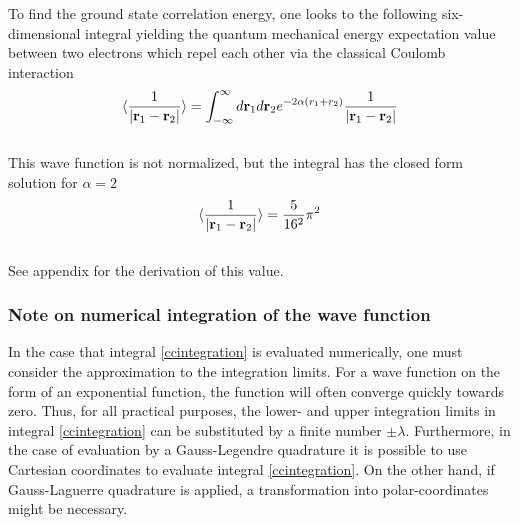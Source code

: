 \documentclass[%
reprint,nofootinbib,
amsmath,amssymb,
aps,
]{revtex4-1}
\begin{document}
To find the ground state correlation energy, one looks to the following six-dimensional integral yielding the quantum mechanical energy expectation value between two electrons which repel each other via the classical Coulomb interaction\vspace{2mm} \\
\begin{equation}\label{ccintegration}
	   \langle \frac{1}{|{\bf r}_1-{\bf r}_2|} \rangle =
	\int_{-\infty}^{\infty} d{\bf r}_1d{\bf r}_2  e^{-2\alpha (r_1+r_2)}\frac{1}{|{\bf r}_1-{\bf r}_2|}
\end{equation}\vspace{2mm} \\
This wave function is not normalized, but the integral has the closed form solution for $\alpha = 2$\vspace{2mm} \\
\begin{equation*}
\langle \frac{1}{|{\bf r}_1-{\bf r}_2|} \rangle = \dfrac{5}{16^2}\pi^2
\end{equation*}\vspace{2mm} \\
See appendix for the derivation of this value. 
\subsubsection{Note on numerical integration of the wave function} \noindent 
In the case that integral \ref{ccintegration} is evaluated numerically, one must consider the approximation to the integration limits. For a wave function on the form of an exponential function, the function will often converge quickly towards zero. Thus, for all practical purposes, the lower- and upper integration limits in integral \ref{ccintegration} can be substituted by a finite number $\pm \lambda$. Furthermore, in the case of evaluation by a Gauss-Legendre quadrature it is possible to use Cartesian coordinates to evaluate integral \ref{ccintegration}. On the other hand, if Gauss-Laguerre quadrature is applied, a transformation into polar-coordinates might be necessary.
\end{document}
